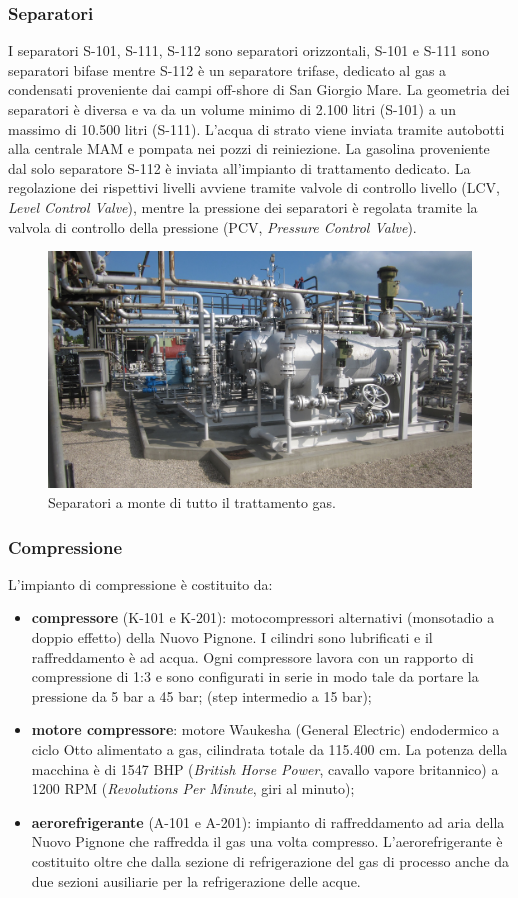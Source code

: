 \subsubsection*{Separatori}
I separatori S-101, S-111, S-112 sono separatori orizzontali, S-101 e S-111 sono separatori bifase mentre S-112 è un separatore trifase, dedicato al gas a condensati proveniente dai campi off-shore di San Giorgio Mare. La geometria dei separatori è diversa e va da un volume minimo di 2.100 litri (S-101) a un massimo di 10.500 litri (S-111). L'acqua di strato viene inviata tramite autobotti alla centrale MAM e pompata nei pozzi di reiniezione. La gasolina proveniente dal solo separatore S-112 è inviata all'impianto di trattamento dedicato.
La regolazione dei rispettivi livelli avviene tramite valvole di controllo livello (LCV, \textit{Level Control Valve}), mentre la pressione dei separatori è regolata tramite la valvola di controllo della pressione (PCV, \textit{Pressure Control Valve}).
\begin{figure}[htbp]
    \centering
    \includegraphics[width=.7\textwidth]{fig/test/centrale/separatori}
    \caption{Separatori a monte di tutto il trattamento gas.} 
    \label{fig:centrale-separatore}
\end{figure}

\subsubsection*{Compressione}
L'impianto di compressione è costituito da:
\begin{itemize}
	\item \textbf{compressore} (K-101 e K-201): motocompressori alternativi (monsotadio a doppio effetto) della Nuovo Pignone. I cilindri sono lubrificati e il raffreddamento è ad acqua. Ogni compressore lavora con un rapporto di compressione di 1:3 e sono configurati in serie in modo tale da portare la pressione da 5 bar a 45 bar; (step intermedio a 15 bar);
	\item \textbf{motore compressore}: motore Waukesha (General Electric) endodermico a ciclo Otto alimentato a gas, cilindrata totale da 115.400 cm. La potenza della macchina è di 1547 BHP (\textit{British Horse Power}, cavallo vapore britannico) a 1200 RPM (\textit{Revolutions Per Minute}, giri al minuto);
	\item \textbf{aerorefrigerante} (A-101 e A-201): impianto di raffreddamento ad aria della Nuovo Pignone che raffredda il gas una volta compresso. L'aerorefrigerante è costituito oltre che dalla sezione di refrigerazione del gas di processo anche da due sezioni ausiliarie per la refrigerazione delle acque.
\end {itemize}

